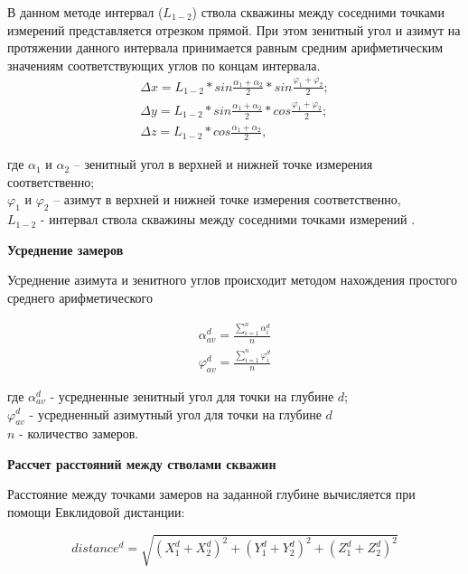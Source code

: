 В данном методе интервал ($ L_{1-2} $) ствола скважины между соседними точками измерений представляется отрезком прямой. При этом зенитный угол
и азимут на протяжении данного интервала принимается равным средним арифметическим значениям соответствующих углов по концам интервала.
\begin{equation}
  \begin{split}
    \Delta x = L_{1-2} * sin \frac{\alpha_1 + \alpha_2}{2} * sin \frac{\varphi_1 + \varphi_2}{2};\\
    \Delta y = L_{1-2} * sin \frac{\alpha_1 + \alpha_2}{2} * cos \frac{\varphi_1 + \varphi_2}{2};\\
    \Delta z = L_{1-2} * cos \frac{\alpha_1 + \alpha_2}{2},
  \end{split}
\end{equation}

где $ \alpha_1 $ и $ \alpha_2 $ – зенитный угол в верхней и нижней точке измерения соответственно;\\
$ \varphi_1 $ и $ \varphi_2 $ – азимут в верхней и нижней точке измерения соответственно,\\
$ L_{1-2} $ - интервал ствола скважины между соседними точками измерений \cite{drilling}.

\textbf{Усреднение замеров}

Усреднение азимута и зенитного углов происходит методом нахождения простого среднего арифметического

\begin{equation}
  \begin{split}
    \alpha_{av}^d = \frac{\sum\limits_{i=1}^{n} \alpha_i^d}{n}\\
    \varphi_{av}^d = \frac{\sum\limits_{i=1}^{n} \varphi_i^d}{n}
  \end{split}
\end{equation}

где $ \alpha_{av}^d $ - усредненные зенитный угол для точки на глубине $d$;\\
$ \varphi_{av}^d $ - усредненный азимутный угол для точки на глубине $d$\\
$ n $ - количество замеров.

\textbf{Рассчет расстояний между стволами скважин}

Расстояние между точками замеров на заданной глубине вычисляется при помощи Евклидовой дистанции:

\begin{equation}
  distance^d = \sqrt{(X_1^d + X_2^d)^2 + (Y_1^d + Y_2^d)^2 + (Z_1^d + Z_2^d)^2 }
\end{equation}


